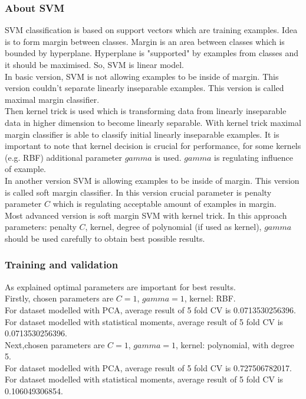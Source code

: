 \documentclass{article}
\begin{document}
\subsubsection{About SVM}
SVM classification is based on support vectors which are training examples. Idea is to form margin between classes. Margin 
is an area between classes which is bounded by hyperplane. Hyperplane is "supported" by examples from classes and it should 
be maximised. So, SVM is linear model.\\
In basic version, SVM is not allowing examples to be inside of margin. This version couldn't separate linearly inseparable 
examples. This version is called maximal margin classifier.\\
Then kernel trick is used which is transforming data from linearly inseparable data in higher dimension to become linearly
separable. With kernel trick maximal margin classifier is able to classify initial linearly inseparable examples. It is important
to note that kernel decision is crucial for performance, for some kernels (e.g. RBF) additional parameter $gamma$ is used.
$gamma$ is regulating influence of example.\\
In another version SVM is allowing examples to be inside of margin. This version is called soft margin classifier. In this 
version crucial parameter is penalty parameter $C$ which is regulating acceptable amount of examples in margin.\\
Most advanced version is soft margin SVM with kernel trick. In this approach parameters: penalty $C$, kernel, degree of polynomial 
(if used as kernel), $gamma$ should be used carefully to obtain best possible results.\\

\subsubsection{Training and validation}
As explained optimal parameters are important for best results. \\
Firstly, chosen parameters are $C = 1$, $gamma = 1$, kernel: RBF.\\
For dataset modelled with PCA, average result of 5 fold CV is 0.0713530256396.\\
For dataset modelled with statistical moments, average result of 5 fold CV is 0.0713530256396.\\

Next,chosen parameters are $C = 1$, $gamma = 1$, kernel: polynomial, with degree 5.\\
For dataset modelled with PCA, average result of 5 fold CV is 0.727506782017.\\
For dataset modelled with statistical moments, average result of 5 fold CV is 0.106049306854.\\
\end{document}
